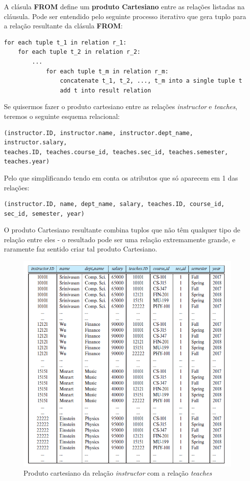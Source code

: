 \documentclass[oneside]{book}
\theoremstyle{definition}
\begin{document}
A clásula \textbf{FROM} define um \textbf{produto Cartesiano} entre as relações listadas na cláusula. Pode ser entendido pelo seguinte processo iterativo que gera tuplo para a relação resultante da clásula \textbf{FROM}:
\begin{verbatim}
for each tuple t_1 in relation r_1:
    for each tuple t_2 in relation r_2:
        ...
            for each tuple t_m in relation r_m:
                concatenate t_1, t_2, ..., t_m into a single tuple t
                add t into result relation   
\end{verbatim}

Se quisermos fazer o produto cartesiano entre as relações \textit{instructor} e \textit{teaches}, teremos o seguinte esquema relacional:
\begin{verbatim}
(instructor.ID, instructor.name, instructor.dept_name, instructor.salary,
teaches.ID, teaches.course_id, teaches.sec_id, teaches.semester, teaches.year)
\end{verbatim}
Pelo que simplificando tendo em conta os atributos que só aparecem em 1 das relações:
\begin{verbatim}
(instructor.ID, name, dept_name, salary, teaches.ID, course_id, sec_id, semester, year)
\end{verbatim}
O produto Cartesiano resultante combina tuplos que não têm qualquer tipo de relação entre eles - o resultado pode ser uma relação extremamente grande, e raramente faz sentido criar tal produto Cartesiano.

\begin{figure}[H]
    \centering
    \includegraphics[scale = 0.4]{cap2/prod_cartesiano.png}
    \caption{Produto cartesiano da relação \textit{instructor} com a relação \textit{teaches}}
\end{figure}
\end{document}
